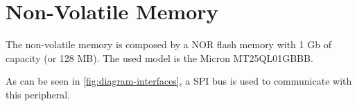 \section{Non-Volatile Memory}

The non-volatile memory is composed by a NOR flash memory with 1 Gb of capacity (or 128 MB). The used model is the Micron MT25QL01GBBB.

As can be seen in \autoref{fig:diagram-interfaces}, a SPI bus is used to communicate with this peripheral.
